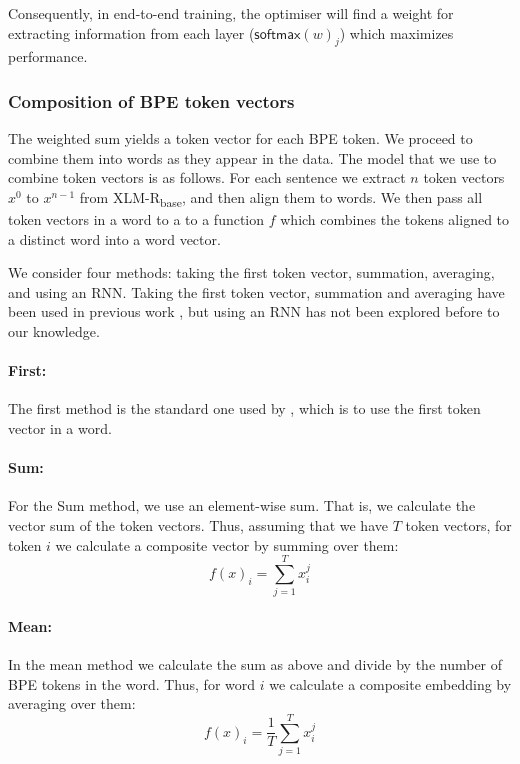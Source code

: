 \documentclass[11pt]{article}
\newcommand\citet{\newcite}
\newcommand\citep{\cite}
\newcommand\softmax{\mathsf{softmax}}
\begin{document}
     Consequently, in end-to-end training, the optimiser will find a
     weight for extracting information from each layer
     ($\softmax(w)_j$) which maximizes performance.

     \subsubsection{Composition of BPE token vectors}
          The weighted sum yields a token vector for each BPE token. We
     proceed to combine them into words as they appear in the data.
      The model that we use to combine token vectors is as
     follows. For each sentence we extract $n$ token vectors $x^0$ to
     $x^{n-1}$ from XLM-R\textsubscript{base}, and then align them to words.
                We then pass all token vectors in a word to a to a
     function $f$ which combines the tokens aligned to a distinct word
     into a word vector.

    We consider four methods: taking the first token vector,
     summation, averaging, and using an RNN. Taking the first token
     vector, summation and averaging have been used in previous work
     \citep{sachan2020syntax,kondratyuk2019cross,devlin2018bert}, but
     using an RNN has not been explored before to our knowledge.

        \paragraph{First:} The first method is the standard one used by
     \citet{devlin2018bert}, which is to use the first token vector in a word.
    
         \paragraph{Sum:} For the Sum method, we use an element-wise
     sum. That is, we calculate the vector sum of the token
     vectors. Thus, assuming that we have $T$ token vectors, for token
     $i$ we calculate a composite vector by summing over them:
	\begin{equation}
	f(x)_i = \sum_{j=1}^{T} x_i^j
	\end{equation}

         \paragraph{Mean:} In the mean method we calculate the sum as
     above and divide by the number of BPE tokens in the word. Thus,
     for word $i$ we calculate a composite embedding by averaging over
     them:
	\begin{equation}
	f(x)_{i} = \frac{1}{T}\sum_{j=1}^{T} x_i^j
	\end{equation}
	
\end{document}

